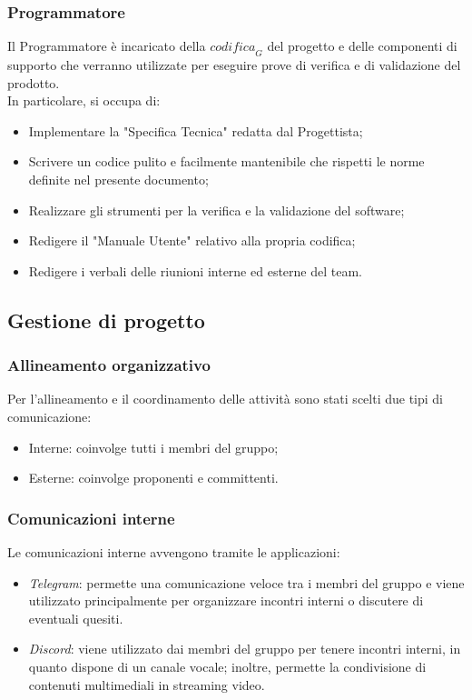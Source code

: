 \subsubsection{Programmatore}
Il Programmatore è incaricato della $\textit{codifica}_G$ del progetto e delle componenti di supporto che verranno utilizzate per eseguire prove di verifica e di validazione del prodotto. \\
In particolare, si occupa di:
\begin{itemize}
    \item Implementare la "Specifica Tecnica" redatta dal Progettista;
    \item Scrivere un codice pulito e facilmente mantenibile che rispetti le norme definite nel presente documento;
    \item Realizzare gli strumenti per la verifica e la validazione del software;
    \item Redigere il "Manuale Utente" relativo alla propria codifica;
    \item Redigere i verbali delle riunioni interne ed esterne del team.
\end{itemize}

\subsection{Gestione di progetto}

\subsubsection{Allineamento organizzativo}
Per l'allineamento e il coordinamento delle attività sono stati scelti due tipi di comunicazione:
\begin{itemize}
    \item Interne: coinvolge tutti i membri del gruppo;
    \item Esterne: coinvolge proponenti e committenti.
\end{itemize}

\subsubsection{Comunicazioni interne}
Le comunicazioni interne avvengono tramite le applicazioni:
\begin{itemize}
    \item \textit{Telegram}: permette una comunicazione veloce tra i membri del gruppo e viene utilizzato principalmente per organizzare incontri interni o discutere di eventuali quesiti.
    \item \textit{Discord}: viene utilizzato dai membri del gruppo per tenere incontri interni, in quanto dispone di un canale vocale; inoltre, permette la condivisione di contenuti multimediali in streaming video.
\end{itemize}

